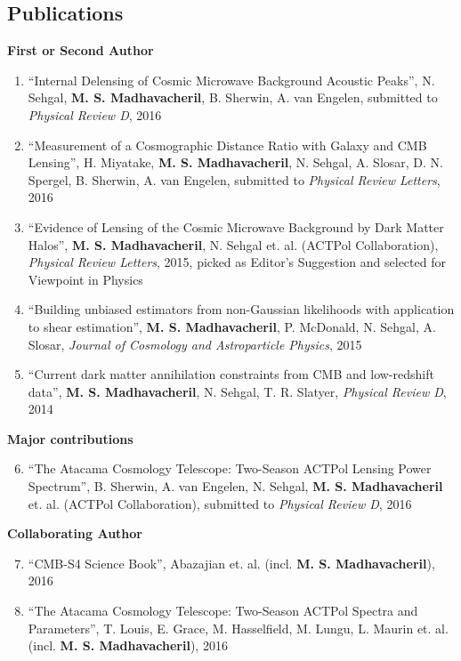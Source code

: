 \documentclass[10pt,margin]{res}
\begin{document}
\begin{resume}
\section{Publications}

\textbf{First or Second Author}
\\
\begin{enumerate}
\item ``Internal Delensing of Cosmic Microwave Background Acoustic Peaks'', N. Sehgal, {\bf M. S. Madhavacheril}, B. Sherwin, A. van Engelen, submitted to {\sl Physical Review D}, 2016
\item ``Measurement of a Cosmographic Distance Ratio with Galaxy and CMB Lensing'', H. Miyatake, {\bf M. S. Madhavacheril}, N. Sehgal, A. Slosar, D. N. Spergel, B. Sherwin, A. van Engelen, submitted to {\sl Physical Review Letters}, 2016
\item ``Evidence of Lensing of the Cosmic Microwave Background by Dark Matter Halos'', {\bf M. S. Madhavacheril}, N. Sehgal et. al. (ACTPol Collaboration), {\sl Physical Review Letters}, 2015, picked as Editor's Suggestion and selected for Viewpoint in Physics
\item ``Building unbiased estimators from non-Gaussian likelihoods with application to shear estimation'', {\bf M. S. Madhavacheril}, P. McDonald, N. Sehgal, A. Slosar, {\sl Journal of Cosmology and Astroparticle Physics}, 2015
\item ``Current dark matter annihilation constraints from CMB and low-redshift data'', {\bf M. S. Madhavacheril}, N. Sehgal, T. R. Slatyer, {\sl Physical Review D}, 2014
\end{enumerate}
\newpage
\textbf{Major contributions}
\\
\begin{enumerate}
\setcounter{enumi}{5}
\item ``The Atacama Cosmology Telescope: Two-Season ACTPol Lensing Power Spectrum'', B. Sherwin, A. van Engelen, N. Sehgal, {\bf M. S. Madhavacheril} et. al. (ACTPol Collaboration), submitted to {\sl Physical Review D}, 2016
\end{enumerate}
\textbf{Collaborating Author}
\\
\begin{enumerate}
\setcounter{enumi}{6}
\item ``CMB-S4 Science Book'', Abazajian et. al. (incl. {\bf M. S. Madhavacheril}), 2016
\item ``The Atacama Cosmology Telescope: Two-Season ACTPol Spectra and Parameters'', T. Louis, E. Grace, M. Hasselfield, M. Lungu, L.  Maurin et. al. (incl. {\bf M. S. Madhavacheril}), 2016

\end{enumerate}
\end{resume}
\end{document}
